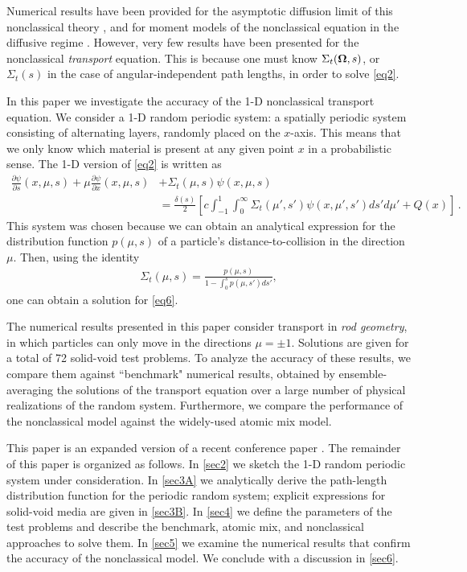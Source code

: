 \documentclass[12pt]{article}
\newcommand{\uomega}{{\bf \Omega}}
\begin{document}
Numerical results have been provided for the asymptotic diffusion limit of this nonclassical theory \cite{larvas11,vaslar09,vas13,vaslar14b}, and for moment models of the nonclassical equation in the diffusive regime \cite{kry13}.
However, very few results have been presented for the nonclassical \textit{transport} equation.
This is because one must know $\Sigma_t(\uomega,s)$, or $\Sigma_t(s)$ in the case of angular-independent path lengths, in order to solve \cref{eq2}. 

In this paper we investigate the accuracy of the 1-D nonclassical transport equation.
We consider a 1-D random periodic system: a spatially periodic system consisting of alternating layers, randomly placed on the $x$-axis.
This means that we only know which material is present at any given point $x$ in a probabilistic sense.
The 1-D version of \cref{eq2} is written as
\begin{align}\label{eq6}
\frac{\partial\psi}{\partial s}(x,\mu,s) + \mu\frac{\partial \psi}{\partial x}(x,\mu,s) &+ \Sigma_t(\mu,s)\psi(x,\mu,s) 
\\& = \frac{\delta(s)}{2}\left[ c\int_{-1}^1\int_0^\infty \Sigma_t(\mu',s')\psi(x,\mu',s')ds' d\mu' + Q(x) \right]\,. \nonumber
\end{align}
This system was chosen because we can obtain an analytical expression for the distribution function $p(\mu,s)$ of a particle's distance-to-collision in the direction $\mu$.
Then, using the identity \cite{vaslar14a}
\begin{align}\label{eq7}
\Sigma_t(\mu,s)=\frac{p(\mu,s)}{1-\int_0^sp(\mu,s')ds'},
\end{align}
one can obtain a solution for \cref{eq6}.

The numerical results presented in this paper consider transport in {\em rod geometry}, in which particles can only move in the directions $\mu = \pm 1$.
Solutions are given for a total of 72 solid-void test problems.
To analyze the accuracy of these results, we compare them against ``benchmark" numerical results, obtained by ensemble-averaging the solutions of the transport equation over a large number of physical realizations of the random system.
Furthermore, we compare the performance of the nonclassical model against the widely-used atomic mix model.

This paper is an expanded version of a recent conference paper \cite{mc15}.
The remainder of this paper is organized as follows.
In \cref{sec2} we sketch the 1-D random periodic system under consideration.
In \cref{sec3A} we analytically derive the path-length distribution function for the periodic random system; explicit expressions for solid-void media are given in \cref{sec3B}.
In \cref{sec4} we define the parameters of the test problems and describe the benchmark, atomic mix, and nonclassical approaches to solve them.
In \cref{sec5} we examine the numerical results that confirm the accuracy of the nonclassical model.
We conclude with a discussion in \cref{sec6}.
\end{document}
